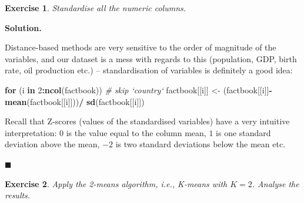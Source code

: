 \documentclass[10pt,b5paper,krantz1]{krantz}
\newenvironment{Shaded}{\begin{snugshade}}{\end{snugshade}}
\newcommand{\CommentTok}[1]{\textcolor[rgb]{0.37,0.37,0.37}{\textit{#1}}}
\newcommand{\ControlFlowTok}[1]{\textcolor[rgb]{0.27,0.27,0.27}{\textbf{#1}}}
\newcommand{\DecValTok}[1]{\textcolor[rgb]{0.06,0.06,0.06}{#1}}
\newcommand{\KeywordTok}[1]{\textcolor[rgb]{0.27,0.27,0.27}{\textbf{#1}}}
\newcommand{\NormalTok}[1]{#1}
\newcommand{\OperatorTok}[1]{\textcolor[rgb]{0.43,0.43,0.43}{\textbf{#1}}}
\newcommand{\StringTok}[1]{\textcolor[rgb]{0.5,0.5,0.5}{#1}}
\newtheorem{exercise}{Exercise}[chapter]
\newenvironment{solution}{%
\bigskip\noindent\textbf{Solution. }%
\it\ignorespaces%
\ignorespaces%
}{\ignorespaces%
\hfill$\blacksquare$%
}
\begin{document}
\begin{exercise}

Standardise all the numeric columns.

\end{exercise}

\begin{solution}

Distance-based
methods are very sensitive to the order of magnitude of
the variables, and our dataset is a mess with regards to this
(population, GDP, birth rate, oil production etc.) -- standardisation
of variables is definitely a good idea:

\begin{Shaded}
\begin{Highlighting}[]
\ControlFlowTok{for}\NormalTok{ (i }\ControlFlowTok{in} \DecValTok{2}\OperatorTok{:}\KeywordTok{ncol}\NormalTok{(factbook)) }\CommentTok{# skip `country`}
\NormalTok{    factbook[[i]] <-}\StringTok{ }\NormalTok{(factbook[[i]]}\OperatorTok{-}\KeywordTok{mean}\NormalTok{(factbook[[i]]))}\OperatorTok{/}
\StringTok{                        }\KeywordTok{sd}\NormalTok{(factbook[[i]])}
\end{Highlighting}
\end{Shaded}

Recall that Z-scores (values of the standardised variables)
have a very intuitive interpretation: \(0\) is the value equal to the column
mean, \(1\) is one standard deviation above the mean, \(-2\) is two standard deviations
below the mean etc.

\end{solution}

\begin{exercise}

Apply the 2-means algorithm, i.e., K-means with \(K=2\).
Analyse the results.

\end{exercise}
\end{document}
